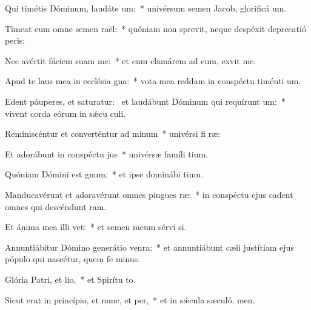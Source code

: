 \item Qui timétis Dóminum, laudáte um:~* univérsum semen Jacob, glorificá um.
\item Tímeat eum omne semen raël:~* quóniam non sprevit, neque despéxit deprecatió peris:
\item Nec avértit fáciem suam  me:~* et cum clamárem ad eum, exvit me.
\item Apud te laus mea in ecclésia gna:~* vota mea reddam in conspéctu timénti um.
\item Edent páuperes, et saturatur:~\pscross{} et laudábunt Dóminum qui requírunt um:~* vivent corda eórum in sǽcu culi.
\item Reminiscéntur et converténtur ad minum~* univérsi fi ræ:
\item Et adorábunt in conspéctu jus~* univérsæ famíli tium.
\item Quóniam Dómini est gnum:~* et ipse dominábi tium.
\item Manducavérunt et adoravérunt omnes pingues ræ:~* in conspéctu ejus cadent omnes qui descéndunt  ram.
\item Et ánima mea illi vet:~* et semen meum sérvi si.
\item Annuntiábitur Dómino generátio venra:~* et annuntiábunt cæli justítiam ejus pópulo qui nascétur, quem fe minus.
\item Glória Patri, et lio,~* et Spirítu to.
\item Sicut erat in princípio, et nunc, et per,~* et in sǽcula sæculó. men.
